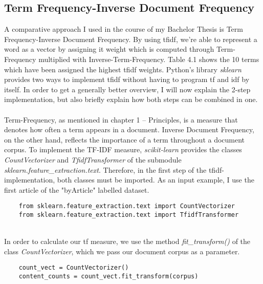 \documentclass[a4paper, 11pt,titlepage,oneside,openany]{book}
\begin{document}
\subsection{Term Frequency-Inverse Document Frequency}
A comparative approach I used in the course of my Bachelor Thesis is Term Frequency-Inverse Document Frequency. By using \gls{tfidf}, we're able to represent a word as a vector by assigning it weight which is computed through Term-Frequency multiplied with Inverse-Term-Frequency. Table 4.1 shows the 10 terms which have been assigned the highest \gls{tfidf} weights. Python's library \textit{sklearn} provides two ways to implement \gls{tfidf} without having to program \gls{tf} and \gls{idf} by itself.
In order to get a generally better overview, I will now explain the 2-step implementation, but also briefly explain how both steps can be combined in one. \\
\\ Term-Frequency, as mentioned in chapter 1 -- Principles, is a measure that denotes how often a term appears in a document. Inverse Document Frequency, on the other hand, reflects the importance of a term throughout a document corpus. To implement the TF-IDF measure, \textit{scikit-learn} provides the classes \textit{CountVectorizer} and \textit{TfidfTransformer} of the submodule \textit{sklearn.feature\_extraction.text}. Therefore, in the first step of the \gls{tfidf}-implementation, both classes must be imported. As an input example, I use the first article of the "byArticle" labelled dataset. \\
\noindent
\begin{minipage}{\linewidth}
	\begin{lstlisting}
	from sklearn.feature_extraction.text import CountVectorizer
	from sklearn.feature_extraction.text import TfidfTransformer
	\end{lstlisting}
\end{minipage}\\
\noindent In order to calculate our \gls{tf} measure, we use the method \textit{fit\_transform()} of the class \textit{CountVectorizer}, which we pass our document corpus as a parameter. \\
\noindent
\begin{minipage}{\linewidth}
	\begin{lstlisting}
	count_vect = CountVectorizer()
	content_counts = count_vect.fit_transform(corpus)
	\end{lstlisting}
\end{minipage} \\
\end{document}
